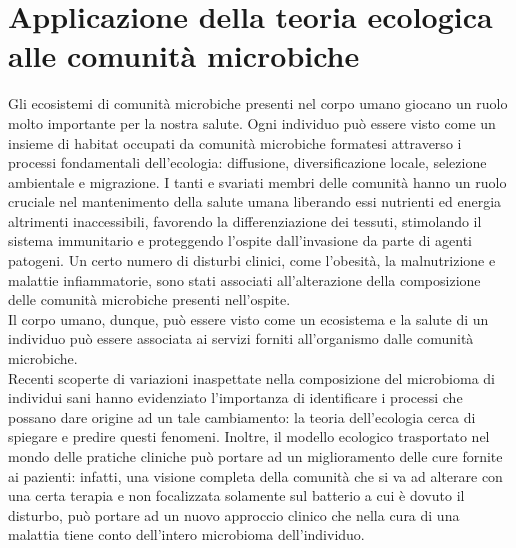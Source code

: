 \chapter{Applicazione della teoria ecologica alle comunità microbiche}

Gli ecosistemi di comunità microbiche presenti nel corpo umano giocano un ruolo molto importante per la nostra salute\cite{Costello1255}. Ogni individuo può essere visto come un insieme di habitat occupati da comunità microbiche formatesi attraverso i processi fondamentali dell'ecologia: diffusione, diversificazione locale, selezione ambientale e migrazione. I tanti e svariati membri delle comunità hanno un ruolo cruciale nel mantenimento della salute umana liberando essi nutrienti ed energia altrimenti inaccessibili, favorendo la differenziazione dei tessuti, stimolando il sistema immunitario e proteggendo l'ospite dall'invasione da parte di agenti patogeni. 
Un certo numero di disturbi clinici, come l'obesità, la malnutrizione e malattie infiammatorie, sono stati associati all'alterazione della composizione delle comunità microbiche presenti nell'ospite.\\
Il corpo umano, dunque, può essere visto come un ecosistema e la salute di un individuo può essere associata ai servizi forniti
all'organismo dalle comunità microbiche.\\
Recenti scoperte di variazioni inaspettate nella composizione del microbioma di individui sani hanno evidenziato l'importanza di identificare i processi che possano dare origine ad un tale cambiamento: la teoria dell'ecologia cerca di spiegare e predire questi fenomeni. Inoltre, il modello ecologico trasportato nel mondo delle pratiche cliniche può portare ad un miglioramento delle cure fornite ai pazienti: infatti, una visione completa della comunità che si va ad alterare con una certa terapia e non focalizzata solamente sul batterio a cui è dovuto il disturbo, può portare ad un nuovo approccio clinico che nella cura di una malattia tiene conto dell'intero microbioma dell'individuo.

